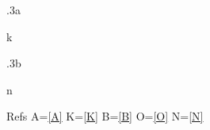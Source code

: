 \documentclass{article}
\begin{document}
\listoftables
\begin{table}[h]
\begin{subtable}{.3\linewidth}\centering a\caption{A}\label{A}\end{subtable}
\begin{minipage}{.3\linewidth}\begin{table}[H]\centering k\caption{K}\label{K}\end{table}\end{minipage}
\begin{subtable}{.3\linewidth}\centering b\caption{B}\label{B}\end{subtable}
\caption{Outer}\label{O}
\end{table}
\begin{table}[h]\centering n\caption{Next}\label{N}\end{table}
Refs A=\ref{A} K=\ref{K} B=\ref{B} O=\ref{O} N=\ref{N}
\end{document}
